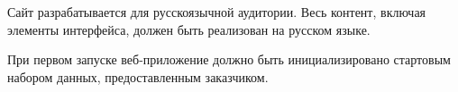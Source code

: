 
Сайт разрабатывается для русскоязычной аудитории. Весь контент, включая элементы интерфейса, должен быть реализован на русском языке.

При первом запуске веб-приложение должно быть инициализировано стартовым набором данных, предоставленным заказчиком.